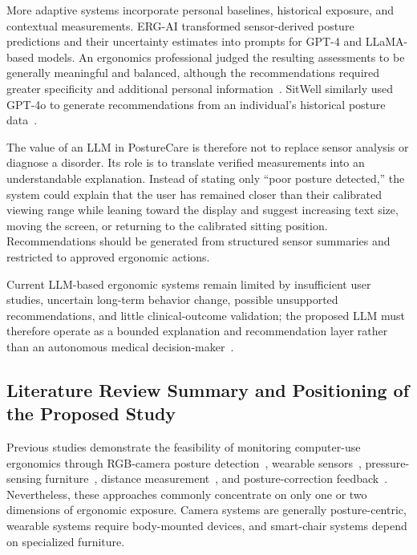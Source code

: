 More adaptive systems incorporate personal baselines, historical exposure, and contextual measurements. ERG-AI transformed sensor-derived posture predictions and their uncertainty estimates into prompts for GPT-4 and LLaMA-based models. An ergonomics professional judged the resulting assessments to be generally meaningful and balanced, although the recommendations required greater specificity and additional personal information~\cite{ref14}. SitWell similarly used GPT-4o to generate recommendations from an individual's historical posture data~\cite{ref15}.

The value of an LLM in PostureCare is therefore not to replace sensor analysis or diagnose a disorder. Its role is to translate verified measurements into an understandable explanation. Instead of stating only ``poor posture detected,'' the system could explain that the user has remained closer than their calibrated viewing range while leaning toward the display and suggest increasing text size, moving the screen, or returning to the calibrated sitting position. Recommendations should be generated from structured sensor summaries and restricted to approved ergonomic actions.

Current LLM-based ergonomic systems remain limited by insufficient user studies, uncertain long-term behavior change, possible unsupported recommendations, and little clinical-outcome validation; the proposed LLM must therefore operate as a bounded explanation and recommendation layer rather than an autonomous medical decision-maker~\cite{ref14,ref15,ref17}.

\subsection{Literature Review Summary and Positioning of the Proposed Study}
Previous studies demonstrate the feasibility of monitoring computer-use ergonomics through RGB-camera posture detection~\cite{ref16,ref19,ref23,ref24}, wearable sensors~\cite{ref13,ref14}, pressure-sensing furniture~\cite{ref15}, distance measurement~\cite{ref4,ref5,ref6}, and posture-correction feedback~\cite{ref14,ref15,ref25}. Nevertheless, these approaches commonly concentrate on only one or two dimensions of ergonomic exposure. Camera systems are generally posture-centric, wearable systems require body-mounted devices, and smart-chair systems depend on specialized furniture.

